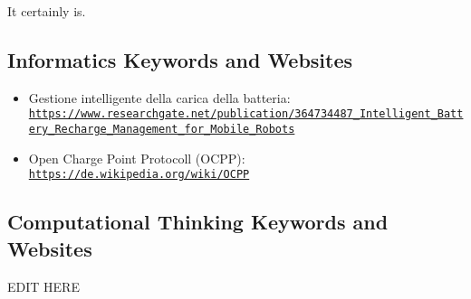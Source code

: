 \documentclass[a4paper,11pt]{report}
\newcommand{\BrochureUrlText}[1]{\texttt{#1}}
\begin{document}
It certainly is.


\subsection*{Informatics Keywords and Websites}

\begin{itemize}
  \item Gestione intelligente della carica della batteria: \href{https://www.researchgate.net/publication/364734487_Intelligent_Battery_Recharge_Management_for_Mobile_Robots}{\BrochureUrlText{https://www.researchgate.net/publication/364734487\_Intelligent\_Battery\_Recharge\_Management\_for\_Mobile\_Robots}}
  \item Open Charge Point Protocoll (OCPP): \href{https://de.wikipedia.org/wiki/OCPP}{\BrochureUrlText{https://de.wikipedia.org/wiki/OCPP}}
\end{itemize}


\subsection*{Computational Thinking Keywords and Websites}

EDIT HERE
\end{document}
